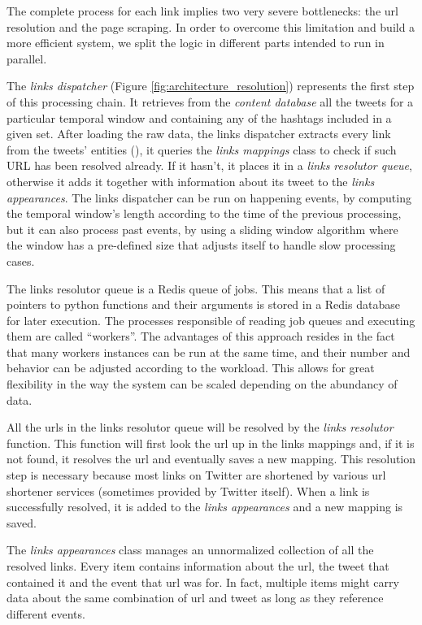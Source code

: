 \documentclass{sig-alternate}
\begin{document}
The complete process for each link implies two very severe bottlenecks: the url resolution and the page scraping. In order to overcome this limitation and build a more efficient system, we split the logic in different parts intended to run in parallel.

The \emph{links dispatcher} (Figure \ref{fig:architecture_resolution}) represents the first step of this processing chain. It retrieves from the \emph{content database} all the tweets for a particular temporal window and containing any of the hashtags included in a given set. After loading the raw data, the links dispatcher extracts every link from the tweets' entities (\cite{RestTweetsDoc}), it queries the \emph{links mappings} class to check if such URL has been resolved already. If it hasn't, it places it in a \emph{links resolutor queue}, otherwise it adds it together with information about its tweet to the \emph{links appearances}. The links dispatcher can be run on happening events, by computing the temporal window's length according to the time of the previous processing, but it can also process past events, by using a sliding window algorithm where the window has a pre-defined size that adjusts itself to handle slow processing cases.

The links resolutor queue is a Redis queue\cite{RedisQueues} of jobs. This means that a list of pointers to python functions and their arguments is stored in a Redis database for later execution. The processes responsible of reading job queues and executing them are called ``workers''. The advantages of this approach resides in the fact that many workers instances can be run at the same time, and their number and behavior can be adjusted according to the workload. This allows for great flexibility in the way the system can be scaled depending on the abundancy of data.

All the urls in the links resolutor queue will be resolved by the \emph{links resolutor} function. This function will first look the url up in the links mappings and, if it is not found, it resolves the url and eventually saves a new mapping. This resolution step is necessary because most links on Twitter are shortened by various url shortener services (sometimes provided by Twitter itself). When a link is successfully resolved, it is added to the \emph{links appearances} and a new mapping is saved.

The \emph{links appearances} class manages an unnormalized collection of all the resolved links. Every item contains information about the url, the tweet that contained it and the event that url was for. In fact, multiple items might carry data about the same combination of url and tweet as long as they reference different events.
\end{document}
